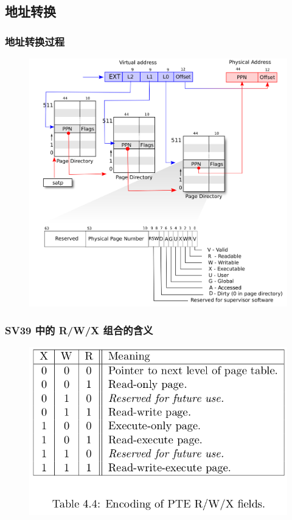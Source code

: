 \subsection{地址转换}
\begin{frame}
    \frametitle{地址转换过程}
% 
% 
    \begin{figure}
        \centering
        \includegraphics[width=0.45\linewidth]{figs/sv39-full.png}
    \end{figure}
% 
% 
\end{frame}
\begin{frame}
    \frametitle{SV39 中的 R/W/X 组合的含义}
    \begin{figure}
        \centering
        \includegraphics[width=0.6\linewidth]{figs/pte-rwx.png}
    \end{figure}
% 
% 
% 
% 
\end{frame}
